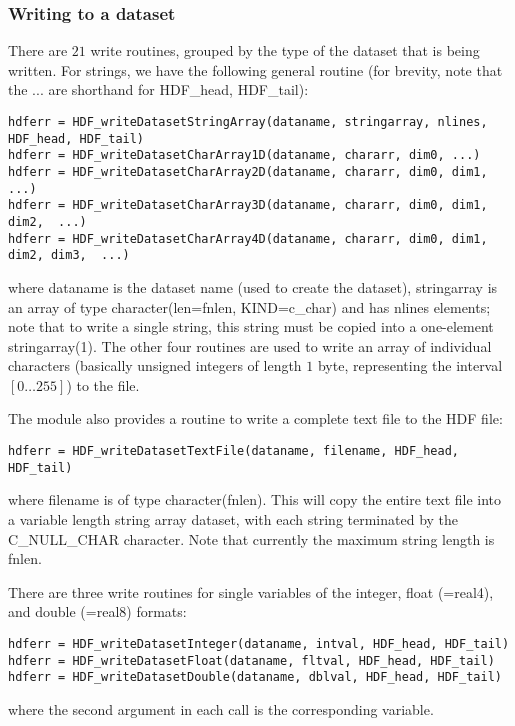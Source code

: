 \documentclass[DIV=calc, paper=letter, fontsize=11pt]{scrartcl}	 %
\begin{document}
\subsubsection{Writing to a dataset}
There are $21$ write routines, grouped by the type of the dataset that is being written.
For strings, we have the following general routine (for brevity, note that the ... are shorthand for \textsf{HDF\_head, HDF\_tail}):
\begin{verbatim}
hdferr = HDF_writeDatasetStringArray(dataname, stringarray, nlines, HDF_head, HDF_tail)
hdferr = HDF_writeDatasetCharArray1D(dataname, chararr, dim0, ...)
hdferr = HDF_writeDatasetCharArray2D(dataname, chararr, dim0, dim1,  ...)
hdferr = HDF_writeDatasetCharArray3D(dataname, chararr, dim0, dim1, dim2,  ...)
hdferr = HDF_writeDatasetCharArray4D(dataname, chararr, dim0, dim1, dim2, dim3,  ...)
\end{verbatim}
where \textsf{dataname} is the dataset name (used to create the dataset), \textsf{stringarray} 
is an array of type \textsf{character(len=fnlen, KIND=c\_char)} and has \textsf{nlines} elements; note
that to write a single string, this string must be copied into a one-element stringarray(1). The other
four routines are used to write an array of individual characters (basically unsigned integers of length
$1$ byte, representing the interval $[0\ldots 255]$) to the file.

The module also provides a routine to write a complete text file to the HDF file:
\begin{verbatim}
hdferr = HDF_writeDatasetTextFile(dataname, filename, HDF_head, HDF_tail)
\end{verbatim}
where \textsf{filename} is of type \textsf{character(fnlen)}.  This will copy the entire text file 
into a variable length string array dataset, with each string terminated by the \textsf{C\_NULL\_CHAR}
character.  Note that currently the maximum string length is \textsf{fnlen}.

There are three write routines for single variables of the \textsf{integer}, \textsf{float} (=real4),
and \textsf{double} (=real8) formats:
\begin{verbatim}
hdferr = HDF_writeDatasetInteger(dataname, intval, HDF_head, HDF_tail)
hdferr = HDF_writeDatasetFloat(dataname, fltval, HDF_head, HDF_tail)
hdferr = HDF_writeDatasetDouble(dataname, dblval, HDF_head, HDF_tail)
\end{verbatim}
where the second argument in each call is the corresponding variable.
\end{document}
